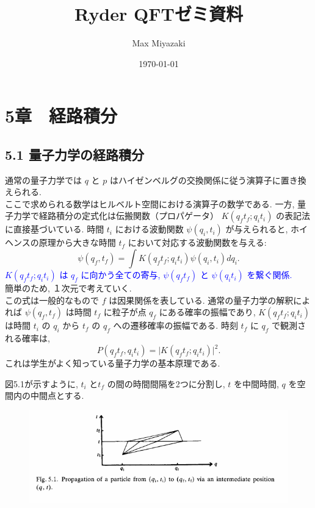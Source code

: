 \documentclass{jsarticle}
\title{Ryder QFTゼミ資料}
\date{\today}
\author{Max Miyazaki}
\begin{document}
\maketitle
\section*{\textrm{5章　経路積分}}
\subsection*{\textrm{5.1 量子力学の経路積分}}
通常の量子力学では $q$ と $p$ はハイゼンベルグの交換関係に従う演算子に置き換えられる.\\
ここで求められる数学はヒルベルト空間における演算子の数学である. 一方, 量子力学で経路積分の定式化は伝搬関数（プロパゲータ） $K(q_{f}t_{f}; q_{i}t_{i})$ の表記法に直接基づいている. 時間 $t_{i}$ における波動関数 $\psi(q_i, t_i)$ が与えられると, ホイヘンスの原理から大きな時間 $t_f$ において対応する波動関数を与える:
\begin{equation*}
    \psi(q_f, t_f) = \int K(q_{f}t_{f}; q_{i}t_{i})\psi(q_i, t_i)dq_i. \tag{5.1}
\end{equation*}
\textcolor{blue}{$K(q_{f}t_{f}; q_{i}t_{i})$ は $q_{f}$ に向かう全ての寄与, $\psi(q_{f}t_{f})$ と $\psi(q_{i}t_{i})$ を繋ぐ関係.}\\
簡単のため, １次元で考えていく.\\
この式は一般的なもので $f$ は因果関係を表している. 通常の量子力学の解釈によれば $\psi(q_f, t_f)$ は時間 $t_f$ に粒子が点 $q_f$ にある確率の振幅であり, $K(q_{f}t_{f}; q_{i}t_{i})$ は時間 $t_i$ の $q_i$ から $t_f$ の $q_f$ への遷移確率の振幅である.
時刻 $t_f$ に $q_f$ で観測される確率は,
\begin{equation*}
    P(q_{f}t_{f}, q_{i}t_{i}) = \lvert K(q_{f}t_{f}; q_{i}t_{i}) \rvert^2.
\end{equation*}
これは学生がよく知っている量子力学の基本原理である.\par
図5.1が示すように, $t_i$ と$t_f$ の間の時間間隔を2つに分割し, $t$ を中間時間, $q$ を空間内の中間点とする.

\begin{figure}[H]
    \centering
    \includegraphics[width=15cm]{figure/fig5-1.png}
\end{figure}
\end{document}
